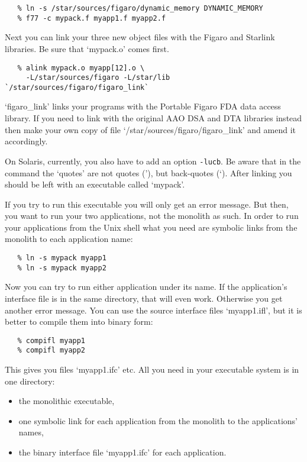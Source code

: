 \begin{verbatim}
   % ln -s /star/sources/figaro/dynamic_memory DYNAMIC_MEMORY
   % f77 -c mypack.f myapp1.f myapp2.f
\end{verbatim}

   Next you can link your three new object files with the Figaro and
   Starlink libraries. Be sure that `mypack.o' comes first.

\begin{verbatim}
   % alink mypack.o myapp[12].o \
     -L/star/sources/figaro -L/star/lib `/star/sources/figaro/figaro_link`
\end{verbatim}

   `figaro\_link' links your programs with the Portable Figaro FDA data
   access library.  If you need to link with the original AAO DSA and
   DTA libraries instead then make your own copy of file
   `/star/sources/figaro/figaro\_link' and amend it accordingly.

   On Solaris, currently, you also have to add an option {\tt -lucb}.
   Be aware that in the command the `quotes' are not quotes ('), but
   back-quotes (`). After linking you should be left with an executable
   called `mypack'.

   If you try to run this executable you will only get an error message.
   But then, you want to run your two applications, not the monolith as
   such. In order to run your applications from the Unix shell what
   you need are symbolic links from the monolith to each application name:

\begin{verbatim}
   % ln -s mypack myapp1
   % ln -s mypack myapp2
\end{verbatim}

   Now you can try to run either application under its name. If the
   application's interface file is in the same directory, that will even
   work. Otherwise you get another error message. You can use the
   source interface files `myapp1.ifl', but it is better to compile them
   into binary form:

\begin{verbatim}
   % compifl myapp1
   % compifl myapp2
\end{verbatim}

   This gives you files `myapp1.ifc' etc. All you need in your
   executable system is in one directory:

\begin{itemize}
\item
   the monolithic executable,
\item
   one symbolic link for each application from the monolith to the
   applications' names,
\item
   the binary interface file `myapp1.ifc' for each application.
\end{itemize}

